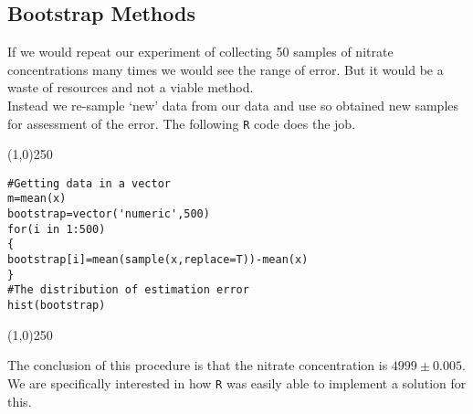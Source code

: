 

\subsection{Bootstrap Methods}
If we would repeat our experiment of collecting 50 samples of nitrate concentrations many times we would see the range of error. But it would be a waste of resources and not a viable method.\\
Instead we re-sample `new' data from our data and use so obtained new samples for assessment of the error.
The following \texttt{R} code does the job.
\begin{center}
	\line(1,0){250}
\end{center}
\begin{verbatim}
#Getting data in a vector
m=mean(x)
bootstrap=vector('numeric',500)
for(i in 1:500)
{
bootstrap[i]=mean(sample(x,replace=T))-mean(x)
}
#The distribution of estimation error
hist(bootstrap)
\end{verbatim}
\begin{center}
	\line(1,0){250}
\end{center}
The conclusion of this procedure is that the nitrate concentration is $4999 \pm 0.005$. We are specifically interested in how \texttt{R} was easily able to implement a solution for this.
\newpage